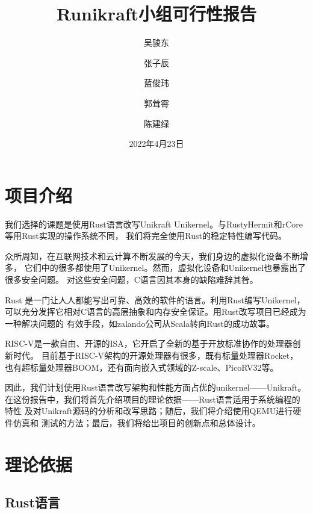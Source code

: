 \documentclass{../runikraft-report}
\renewcommand{\today}{2022年4月23日}
\begin{document}
\title{\bfseries Runikraft小组\quad 可行性报告}
\author{吴骏东\and 张子辰\and 蓝俊玮\and 郭耸霄\and 陈建绿}
\date{\today}
\maketitle

\tableofcontents
\section{项目介绍}
我们选择的课题是使用Rust语言改写Unikraft Unikernel。与RustyHermit和rCore等用Rust实现的操作系统不同，
我们将完全使用Rust的稳定特性编写代码。

众所周知，在互联网技术和云计算不断发展的今天，我们身边的虚拟化设备不断增多，
它们中的很多都使用了Unikernel。然而，虚拟化设备和Unikernel也暴露出了很多安全问题。
对这些安全问题，C语言因其本身的缺陷难辞其咎。

Rust 是一门让人人都能写出可靠、高效的软件的语言。\cite{7}利用Rust编写Unikernel，
可以充分发挥它相对C语言的高层抽象和内存安全保证。用Rust改写项目已经成为一种解决问题的
有效手段，如zalando公司从Scala转向Rust的成功故事。\cite{3}

RISC-V是一款自由、开源的ISA，它开启了全新的基于开放标准协作的处理器创新时代。\cite{0}
目前基于RISC-V架构的开源处理器有很多，既有标量处理器Rocket，
也有超标量处理器BOOM，还有面向嵌入式领域的Z-scale、PicoRV32等。\cite{2}

因此，我们计划使用Rust语言改写架构和性能方面占优的unikernel——Unikraft。
在这份报告中，我们将首先介绍项目的理论依据——Rust语言适用于系统编程的特性
及对Unikraft源码的分析和改写思路；随后，我们将介绍使用QEMU进行硬件仿真和
测试的方法；最后，我们将给出项目的创新点和总体设计。
\section{理论依据}
\subsection{Rust语言}\vspace*{-4ex}
\end{document}
